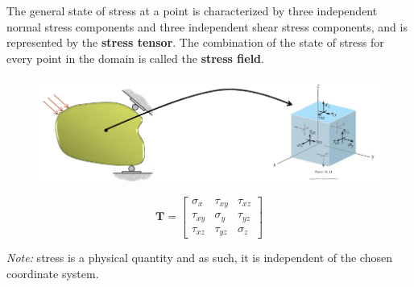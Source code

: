 \section{}

\subsection{}

The general state of stress at a point is characterized by three independent normal stress components and three independent shear stress components, and is represented by the \textbf{stress tensor}. The combination of the state of stress for every point in the domain is called the \textbf{stress field}.

\begin{figure}[!h]
\centering
\includegraphics[angle=0, width=5in]{Stress Transformation-Figures/General Stress State.png}
\vspace{-2mm}
\caption{\small {}}
\vspace{-3mm}
\label{Fig:GenStress}
\end{figure}

\[\boldsymbol{T}=
\begin{bmatrix}
\sigma_{x} & \tau_{xy} & \tau_{xz}\\
\tau_{xy} & \sigma_{y} & \tau_{yz}\\
\tau_{xz} & \tau_{yz} & \sigma_{z}
\end{bmatrix}\]

\noindent \textit{Note:} stress is a physical quantity and as such, it is independent of the chosen coordinate system.

\subsubsection{}

